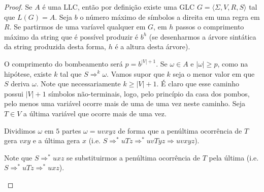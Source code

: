 \begin{proof}
  Se $A$ é uma LLC, então por definição existe uma GLC $G = \langle \Sigma, V, R, S \rangle$ tal que $L(G) = A$.
  Seja $b$ o número máximo de símbolos a direita em uma regra em $R$.
  Se partirmos de uma varíavel qualquer em $G$, em $h$ passos o comprimento máximo da string que é possível produzir é $b^h$ (se desenharmos a árvore sintática da string produzida desta forma, $h$ é a altura desta árvore).

  O comprimento do bombeamento será $p = b^{|V| + 1}$.
  Se $\omega \in A$ e $|\omega| \geq p$, como na hipótese, existe $k$ tal que $S \Rightarrow^k \omega$.
  Vamos supor que $k$ seja o menor valor em que $S$ deriva $\omega$.
  Note que necessariamente $k \geq |V| + 1$.
  É claro que esse caminho possui $|V|+1$ símbolos não-terminais, logo, pelo princípio da casa dos pombos, pelo menos uma variável ocorre mais de uma de uma vez neste caminho.
  Seja $T \in V$ a última variável que ocorre mais de uma vez.

  Dividimos $\omega$ em $5$ partes $\omega = uvxyz$ de forma que a penúltima ocorrência de $T$ gera $vxy$ e a última gera $x$ (i.e. $S \Rightarrow^* uTz \Rightarrow^* uvTyz \Rightarrow uvxyz$).


 \begin{center}
  \end{center}

Note que $S \Rightarrow^* uxz$ se substituirmos a penúltima ocorrência de $T$ pela última (i.e. $S \Rightarrow^* uTz \Rightarrow^* uxz$).

 \begin{center}
  \end{center}


\end{proof}
